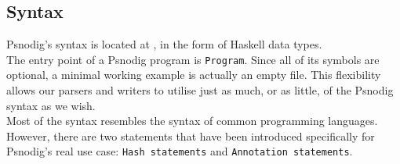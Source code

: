 





\subsection{Syntax}

Psnodig's syntax is located at , in the form of Haskell data types. \\

The entry point of a Psnodig program is \texttt{Program}. Since all of its symbols are optional, a minimal working example is actually an empty file. This flexibility allows our parsers and writers to utilise just as much, or as little, of the Psnodig syntax as we wish. \\

Most of the syntax resembles the syntax of common programming languages. However, there are two statements that have been introduced specifically for Psnodig's real use case: \texttt{Hash statements} and \texttt{Annotation statements}. \\

